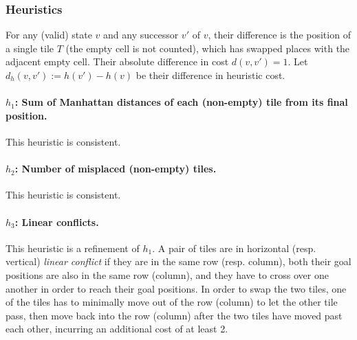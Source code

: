 \documentclass[runningheads]{llncs}
\begin{document}
\subsubsection{Heuristics}

For any (valid) state $v$ and any successor $v'$ of $v$, their difference is the position of a single tile $T$ (the empty cell is not counted), which has swapped places with the adjacent empty cell.
Their absolute difference in cost $d(v,v') = 1$.
Let $d_h(v,v') := h(v')-h(v)$ be their difference in heuristic cost.

\paragraph{$h_1$: Sum of Manhattan distances of each (non-empty) tile from its final position.}
This heuristic is consistent.

\paragraph{$h_2$: Number of misplaced (non-empty) tiles.}
This heuristic is consistent.

\paragraph{$h_3$: Linear conflicts. \cite{Hansson92}}
This heuristic is a refinement of $h_1$. A pair of tiles are in horizontal (resp. vertical) \textit{linear conflict} if they are in the same row (resp. column), both their goal positions are also in the same row (column), and they have to cross over one another in order to reach their goal positions. In order to swap the two tiles, one of the tiles has to minimally move out of the row (column) to let the other tile pass, then move back into the row (column) after the two tiles have moved past each other, incurring an additional cost of at least 2.
\end{document}
